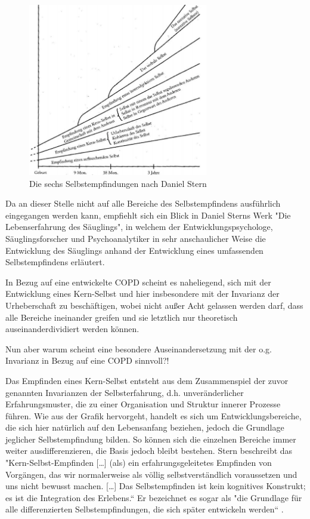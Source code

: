 \begin{figure}
 \centering
  \includegraphics[width=0.7\textwidth]{selbstempfindungen}
  \caption{Die sechs Selbstempfindungen nach Daniel Stern}
  \label{fig:selbstempfindungen}
\end{figure}

Da an dieser Stelle nicht auf alle Bereiche des Selbstempfindens ausführlich eingegangen werden kann, empfiehlt sich ein Blick in Daniel Sterns Werk "Die Lebenserfahrung des Säuglings", in welchem der Entwicklungspsychologe, Säuglingsforscher und Psychoanalytiker in sehr anschaulicher Weise die Entwicklung des Säuglings anhand der Entwicklung eines umfassenden Selbstempfindens erläutert.

In Bezug auf eine entwickelte COPD scheint es naheliegend, sich mit der Entwicklung eines Kern-Selbst und hier insbesondere mit der Invarianz der Urheberschaft zu beschäftigen, wobei nicht außer Acht gelassen werden darf, dass alle Bereiche ineinander greifen und sie letztlich nur theoretisch auseinanderdividiert werden können.

Nun aber warum scheint eine besondere Auseinandersetzung mit der o.g. Invarianz in Bezug auf eine COPD sinnvoll?!

Das Empfinden eines Kern-Selbst entsteht aus dem Zusammenspiel der zuvor genannten Invarianzen der Selbsterfahrung, d.h. unveränderlicher Erfahrungsmuster, die zu einer Organisation und Struktur innerer Prozesse führen. Wie aus der Grafik hervorgeht, handelt es sich um Entwicklungsbereiche, die sich hier natürlich auf den Lebensanfang beziehen, jedoch die Grundlage jeglicher Selbstempfindung bilden. So können sich die einzelnen Bereiche immer weiter ausdifferenzieren, die Basis jedoch bleibt bestehen. 
Stern beschreibt das "Kern-Selbst-Empfinden […] (als) ein erfahrungsgeleitetes Empfinden von Vorgängen, das wir normalerweise als völlig selbstverständlich voraussetzen und uns nicht bewusst machen. […] Das Selbstempfinden ist kein kognitives Konstrukt; es ist die Integration des Erlebens.“ \autocite[106f.]{stern2007} Er bezeichnet es sogar als "die Grundlage für alle differenzierten Selbstempfindungen, die sich später entwickeln werden“ \autocite[106f.]{stern2007}. 


